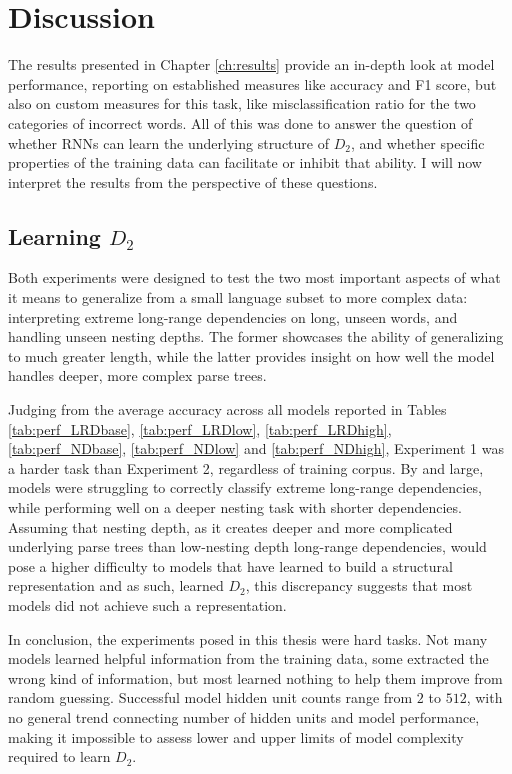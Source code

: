 \section{Discussion}\label{ch:discussion}
The results presented in Chapter \ref{ch:results} provide an in-depth look at model performance, reporting on established measures like accuracy and F1 score, but also on custom measures for this task, like misclassification ratio for the two categories of incorrect words. All of this was done to answer the question of whether RNNs can learn the underlying structure of $D_{2}$, and whether specific properties of the training data can facilitate or inhibit that ability. I will now interpret the results from the perspective of these questions.

\subsection{Learning $D_{2}$}
Both experiments were designed to test the two most important aspects of what it means to generalize from a small language subset to more complex data: interpreting extreme long-range dependencies on long, unseen words, and handling unseen nesting depths. The former showcases the ability of generalizing to much greater length, while the latter provides insight on how well the model handles deeper, more complex parse trees.

Judging from the average accuracy across all models reported in Tables \ref{tab:perf_LRDbase}, \ref{tab:perf_LRDlow}, \ref{tab:perf_LRDhigh}, \ref{tab:perf_NDbase}, \ref{tab:perf_NDlow} and \ref{tab:perf_NDhigh}, Experiment 1 was a harder task than Experiment 2, regardless of training corpus. By and large, models were struggling to correctly classify extreme long-range dependencies, while performing well on a deeper nesting task with shorter dependencies. Assuming that nesting depth, as it creates deeper and more complicated underlying parse trees than low-nesting depth long-range dependencies, would pose a higher difficulty to models that have learned to build a structural representation and as such, learned $D_{2}$, this discrepancy suggests that most models did not achieve such a representation.

In conclusion, the experiments posed in this thesis were hard tasks. Not many models learned helpful information from the training data, some extracted the wrong kind of information, but most learned nothing to help them improve from random guessing. Successful model hidden unit counts range from $2$ to $512$, with no general trend connecting number of hidden units and model performance, making it impossible to assess lower and upper limits of model complexity required to learn $D_{2}$.

